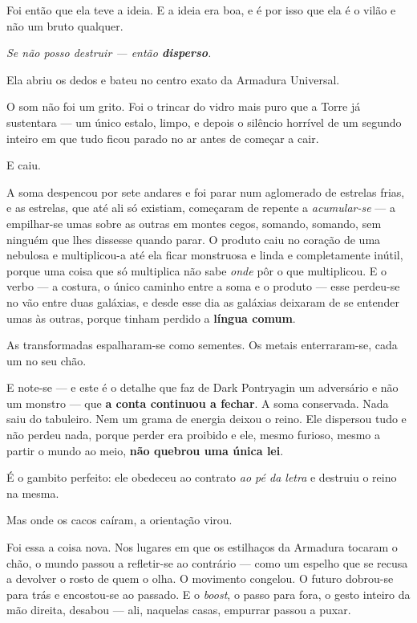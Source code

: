 \documentclass[livro.tex]{subfiles}
\begin{document}
Foi então que ela teve a ideia. E a ideia era boa, e é por isso que ela é o vilão e não um bruto qualquer.

\emph{Se não posso destruir --- então \textbf{disperso}.}

\medskip

Ela abriu os dedos e bateu no centro exato da Armadura Universal.

O som não foi um grito. Foi o trincar do vidro mais puro que a Torre já sustentara --- um único estalo, limpo, e
depois o silêncio horrível de um segundo inteiro em que tudo ficou parado no ar antes de começar a cair.

E caiu.

A soma despencou por sete andares e foi parar num aglomerado de estrelas frias, e as estrelas, que até
ali só existiam, começaram de repente a \emph{acumular-se} --- a empilhar-se umas sobre as outras em montes cegos,
somando, somando, sem ninguém que lhes dissesse quando parar. O produto caiu no coração de uma nebulosa
e multiplicou-a até ela ficar monstruosa e linda e completamente inútil, porque uma coisa que só multiplica não
sabe \emph{onde} pôr o que multiplicou. E o verbo --- a costura, o único caminho
entre a soma e o produto --- esse perdeu-se no vão entre duas galáxias, e desde esse dia as galáxias deixaram de se
entender umas às outras, porque tinham perdido a \textbf{língua comum}.

As transformadas espalharam-se como sementes. Os metais enterraram-se, cada um no seu chão.

E note-se --- e este é o detalhe que faz de Dark Pontryagin um adversário e não um monstro --- que \textbf{a conta
continuou a fechar}. A soma conservada. Nada saiu do tabuleiro. Nem um grama de energia deixou o reino. Ele
dispersou tudo e não perdeu nada, porque perder era proibido e ele, mesmo furioso, mesmo a partir o mundo ao meio,
\textbf{não quebrou uma única lei}.

É o gambito perfeito: ele obedeceu ao contrato \emph{ao pé da letra} e destruiu o reino na mesma.

\medskip

Mas onde os cacos caíram, a orientação virou.

Foi essa a coisa nova. Nos lugares em que os estilhaços da Armadura tocaram o chão, o mundo passou a refletir-se ao
contrário --- como um espelho que se recusa a devolver o rosto de quem o olha. O movimento congelou. O futuro
dobrou-se para trás e encostou-se ao passado. E o \emph{boost}, o passo para fora, o gesto inteiro da mão direita,
desabou --- ali, naquelas casas, empurrar passou a puxar.
\end{document}
